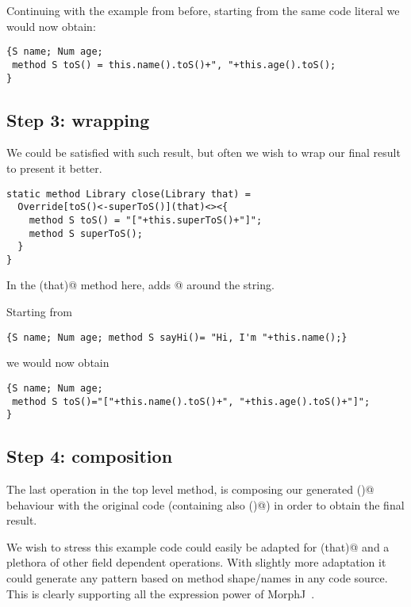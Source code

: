 \noindent
Continuing with the example from before, starting from the same code literal we would now obtain:

\saveSpace
\begin{lstlisting}
{S name; Num age;
 method S toS() = this.name().toS()+", "+this.age().toS();
}
\end{lstlisting}
\saveSpace

\saveSpace\saveSpace
\subsection*{Step 3: wrapping}
We could be satisfied with such result, but often we wish to wrap our final result
to present it better.

\saveSpace
\begin{lstlisting}
static method Library close(Library that) =
  Override[toS()<-superToS()](that)<><{
    method S toS() = "["+this.superToS()+"]";
    method S superToS();
  }
}
\end{lstlisting}
\saveSpace

\noindent
  In the \Q@close(that)@ method here, \Q@Override@ adds \Q@[]@ around the string.

\noindent
Starting from

\saveSpace
\begin{lstlisting}
{S name; Num age; method S sayHi()= "Hi, I'm "+this.name();}
\end{lstlisting}
\saveSpace

\noindent
we would now obtain

\saveSpace
\begin{lstlisting}
{S name; Num age;
 method S toS()="["+this.name().toS()+", "+this.age().toS()+"]";
}
\end{lstlisting}
\saveSpace

\saveSpace\saveSpace
\subsection*{Step 4: composition}
The last operation in the top level method, is composing our generated \Q@toS()@ behaviour with the
original code (containing also \Q@sayHi()@) in order to obtain the final result.

We wish to stress this example code could easily be adapted for \Q@equals(that)@ and
a plethora of other field dependent operations.
With slightly more adaptation it could generate any pattern based on method shape/names in
any code source.
This is clearly supporting all the expression power of MorphJ~\cite{huang2008expressive}.

